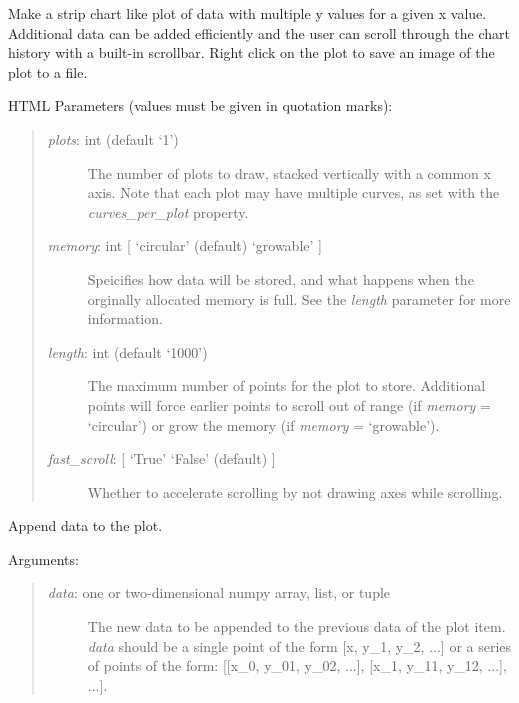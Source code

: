 \documentclass[letterpaper,10pt,english]{sphinxmanual}
\begin{document}
\begin{fulllineitems}
\label{api:mpl.Chart2D}
Make a strip chart like plot of data with multiple y values for a given
x value. Additional data can be added efficiently and the user can scroll
through the chart history with a built-in scrollbar. Right click on the 
plot to save an image of the plot to a file.

HTML Parameters (values must be given in quotation marks):
\begin{quote}
\begin{description}
\item[{\emph{plots}: int (default `1')}] \leavevmode
The number of plots to draw, stacked vertically with a common x axis.
Note that each plot may have multiple curves, as set with the 
\emph{curves\_per\_plot} property.

\item[{\emph{memory}: int {[} `circular' (default) \textbar{} `growable' {]}}] \leavevmode
Speicifies how data will be stored, and what happens when the 
orginally allocated memory is full. See the \emph{length} parameter for more 
information.

\item[{\emph{length}: int (default `1000')}] \leavevmode
The maximum number of points for the plot to store. Additional points
will force earlier points to scroll out of range (if \emph{memory} = `circular')
or grow the memory (if \emph{memory} = `growable').

\item[{\emph{fast\_scroll}: {[} `True' \textbar{} `False' (default) {]}}] \leavevmode
Whether to accelerate scrolling by not drawing axes while scrolling.

\end{description}
\end{quote}

\begin{fulllineitems}
\label{api:mpl.Chart2D.append_data}
Append data to the plot.

Arguments:
\begin{quote}
\begin{description}
\item[{\emph{data}: one or two-dimensional numpy array, list, or tuple}] \leavevmode
The new data to be appended to the previous data of the plot item.
\emph{data} should be a single point of the form {[}x, y\_1, y\_2, ...{]} or a
series of points of the form: 
{[}{[}x\_0, y\_01, y\_02, ...{]}, {[}x\_1, y\_11, y\_12, ...{]}, ...{]}.


\end{description}
\end{quote}
\end{fulllineitems}
\end{fulllineitems}
\end{document}
